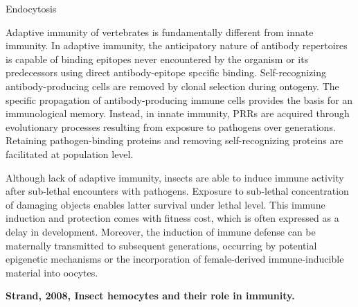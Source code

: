 \documentclass[11pt]{article}
\begin{document}
\begin{sloppypar}
\par
Endocytosis
\par
Adaptive immunity of vertebrates is fundamentally different from innate immunity. 
In adaptive immunity, the anticipatory nature of antibody repertoires is capable of binding epitopes never encountered by the organism or its predecessors using direct antibody-epitope specific binding. 
Self-recognizing antibody-producing cells are removed by clonal selection during ontogeny. 
The specific propagation of antibody-producing immune cells provides the basis for an immunological memory. 
Instead, in innate immunity, PRRs are acquired through evolutionary processes resulting from exposure to pathogens over generations. 
Retaining pathogen-binding proteins and removing self-recognizing proteins are facilitated at population level. 
\par
Although lack of adaptive immunity, insects are able to induce immune activity after sub-lethal encounters with pathogens. 
Exposure to sub-lethal concentration of damaging objects enables latter survival under lethal level. 
This immune induction and protection comes with fitness cost, which is often expressed as a delay in development. 
Moreover, the induction of immune defense can be maternally transmitted to subsequent generations, occurring by potential epigenetic mechanisms or the incorporation of female-derived immune-inducible material into oocytes.
\par \newline \newline
\textbf{Strand, 2008, Insect hemocytes and their role in immunity.}

\end{sloppypar}
\end{document}
